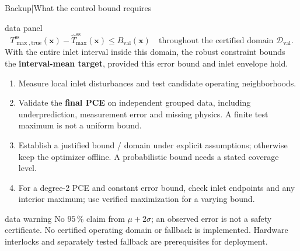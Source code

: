 \begin{frame}{Backup\enspace|\enspace What the control bound requires}
  \begin{beamercolorbox}[sep=2mm,wd=\textwidth]{data panel}
    \small
    \[
      T_{\max,\mathrm{true}}^{\mathrm{ss}}(\mathbf x)
      -\widehat T_{\max}^{\mathrm{ss}}(\mathbf x)
      \leq B_{\mathrm{val}}(\mathbf x)
      \quad\text{throughout the certified domain }\mathcal D_{\mathrm{val}}.
    \]
    With the entire inlet interval inside this domain, the robust constraint bounds
    the \textbf{interval-mean target}, provided this error bound and inlet envelope hold.
  \end{beamercolorbox}
  \smallskip
  \small
  \begin{enumerate}
    \item Measure local inlet disturbances and test candidate operating neighborhoods.
    \item Validate the \textbf{final PCE} on independent grouped data, including underprediction,
      measurement error and missing physics. A finite test maximum is not a uniform bound.
    \item Establish a justified bound / domain under explicit assumptions;
      otherwise keep the optimizer offline. A probabilistic bound needs a stated coverage level.
    \item For a degree-2 PCE and constant error bound, check inlet endpoints and any
      interior maximum; use verified maximization for a varying bound.
  \end{enumerate}
  \begin{beamercolorbox}[sep=1.5mm,wd=\textwidth]{data warning}
    \footnotesize No $95\,\%$ claim from $\mu+2\sigma$; an observed error is not a safety certificate.
    No certified operating domain or fallback is implemented. Hardware interlocks and
    separately tested fallback are prerequisites for deployment.
  \end{beamercolorbox}
\end{frame}




